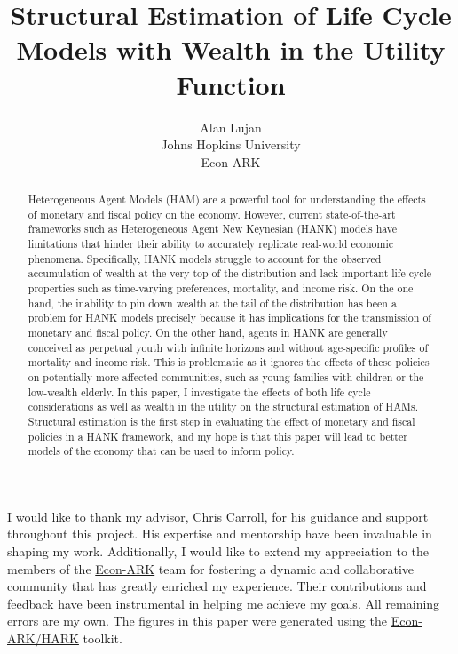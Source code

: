 \documentclass{article}
\title{Structural Estimation of Life Cycle Models with Wealth in the Utility Function}
\date{\displaydate{articleDate}}
\author{Alan Lujan\footnotemark[1]\\
Johns Hopkins University\\Econ-ARK\\}
\begin{document}
\maketitle
{}

\begin{abstract}
Heterogeneous Agent Models (HAM) are a powerful tool for understanding the effects of monetary and fiscal policy on the economy. However, current state-of-the-art frameworks such as Heterogeneous Agent New Keynesian (HANK) models have limitations that hinder their ability to accurately replicate real-world economic phenomena. Specifically, HANK models struggle to account for the observed accumulation of wealth at the very top of the distribution and lack important life cycle properties such as time-varying preferences, mortality, and income risk. On the one hand, the inability to pin down wealth at the tail of the distribution has been a problem for HANK models precisely because it has implications for the transmission of monetary and fiscal policy. On the other hand, agents in HANK are generally conceived as perpetual youth with infinite horizons and without age-specific profiles of mortality and income risk. This is problematic as it ignores the effects of these policies on potentially more affected communities, such as young families with children or the low-wealth elderly. In this paper, I investigate the effects of both life cycle considerations as well as wealth in the utility on the structural estimation of HAMs. Structural estimation is the first step in evaluating the effect of monetary and fiscal policies in a HANK framework, and my hope is that this paper will lead to better models of the economy that can be used to inform policy.
\end{abstract}


I would like to thank my advisor, Chris Carroll, for his guidance and support throughout this project. His expertise and mentorship have been invaluable in shaping my work. Additionally, I would like to extend my appreciation to the members of the \href{https://econ-ark.org/}{Econ-ARK} team for fostering a dynamic and collaborative community that has greatly enriched my experience. Their contributions and feedback have been instrumental in helping me achieve my goals. All remaining errors are my own. The figures in this paper were generated using the \href{https://github.com/econ-ark/HARK}{Econ-ARK/HARK} toolkit.
\end{document}
